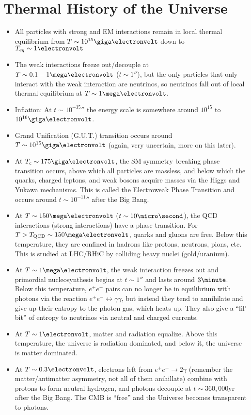 \documentclass[a4paper,twoside,master.tex]{subfiles}
\begin{document}
\section{Thermal History of the Universe}\label{sec:thermal_history_of_the_universe}

\begin{itemize}
    \item All particles with strong and EM interactions remain in local thermal equilibrium from $ T \sim 10^{15} \giga\electronvolt $ down to $ T_{eq} \sim 1 \electronvolt $
    \item The weak interactions freeze out/decouple at $ T \sim 0.1-1 \mega\electronvolt $ ($ t \sim 1 \second $), but the only particles that only interact with the weak interaction are neutrinos, so neutrinos fall out of local thermal equilibrium at $ T \sim 1 \mega\electronvolt $.
    \item Inflation: At $ t \sim 10^{-35} \second $ the energy scale is somewhere around $ 10^{15} $ to $ 10^{16} \giga\electronvolt $.
    \item Grand Unification (G.U.T.) transition occurs around $ T \sim 10^{15} \giga\electronvolt $ (again, very uncertain, more on this later).
    \item At $ T_c \sim 175 \giga\electronvolt $, the SM symmetry breaking phase transition occurs, above which all particles are massless, and below which the quarks, charged leptons, and weak bosons acquire masses via the Higgs and Yukawa mechanisms. This is called the Electroweak Phase Transition and occurs around $ t \sim 10^{-11} \second $ after the Big Bang.
    \item At $ T \sim 150 \mega\electronvolt $ ($ t \sim 10 \micro\second $), the QCD interactions (strong interactions) have a phase transition. For $ T > T_{\text{QCD}} \sim 150 \mega\electronvolt $, quarks and gluons are free. Below this temperature, they are confined in hadrons like protons, neutrons, pions, etc. This is studied at LHC/RHiC by colliding heavy nuclei (gold/uranium).
    \item At $ T \sim 1 \mega\electronvolt $, the weak interaction freezes out and primordial nucleosynthesis begins at $ t \sim 1 \second $ and lasts around $ 3 \minute $. Below this temperature, $ e^+ e^- $ pairs can no longer be in equilibrium with photons via the reaction $ e^+ e^- \leftrightarrow \gamma \gamma  $, but instead they tend to annihilate and give up their entropy to the photon gas, which heats up. They also give a ``lil' bit'' of entropy to neutrinos via neutral and charged currents.
    \item At $ T \sim 1 \electronvolt $, matter and radiation equalize. Above this temperature, the universe is radiation dominated, and below it, the universe is matter dominated.
    \item At $ T \sim 0.3 \electronvolt $, electrons left from $ e^+ e^- \to 2 \gamma $ (remember the matter/antimatter asymmetry, not all of them anihillate) combine with protons to form neutral hydrogen, and photons decouple at $ t \sim 360,000 \text{yr} $ after the Big Bang. The CMB is ``free'' and the Universe becomes transparent to photons.
\end{itemize}
\end{document}
